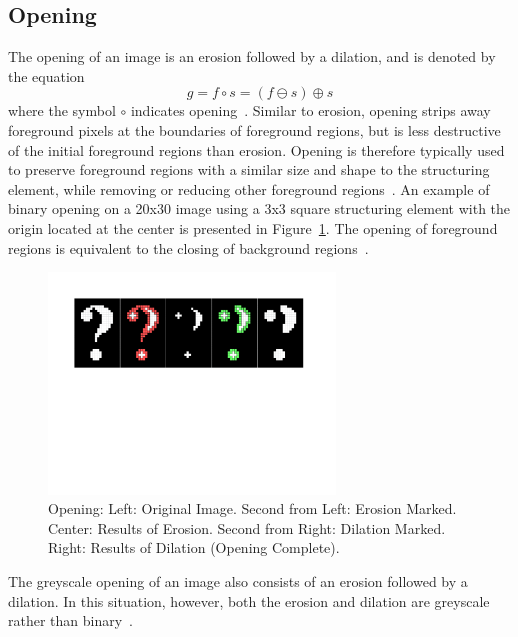 \documentclass{sig-alternate}
\begin{document}
\subsection{Opening}\label{opening}
The opening of an image is an erosion followed by a dilation, and is denoted by the equation
\begin{equation*}
g = f \circ s = (f \ominus s) \oplus s
\end{equation*}
where the symbol $\circ$ indicates opening~\cite{MorphologyWikiAnonymous, MorphologyBook:2000}. Similar to erosion, opening strips away foreground pixels at the boundaries of foreground regions, but is less destructive of the initial foreground regions than erosion. Opening is therefore typically used to preserve foreground regions with a similar size and shape to the structuring element, while removing or reducing other foreground regions~\cite{MorphologyWiki}. An example of binary opening on a 20x30 image using a 3x3 square structuring element with the origin located at the center is presented in Figure~\ref{binary opening figure}. The opening of foreground regions is equivalent to the closing of background regions~\cite{MorphologyWiki}.
\begin{figure}
\centering
\includegraphics[width=3in,trim={0 4.75in 0 0},clip]{opening}
\caption{Opening: Left: Original Image. Second from Left: Erosion Marked. Center: Results of Erosion. Second from Right: Dilation Marked. Right: Results of Dilation (Opening Complete).}
\label{binary opening figure}
\end{figure}

The greyscale opening of an image also consists of an erosion followed by a dilation. In this situation, however, both the erosion and dilation are greyscale rather than binary~\cite{MorphologyPaper:1987}.
\end{document}
